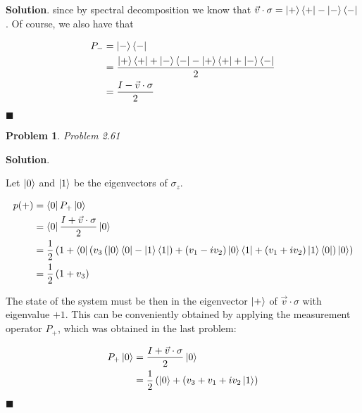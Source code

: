 \documentclass[12pt]{article}
\newtheorem{p}{Problem}
\theoremstyle{definition}
\newenvironment{s}{%
        \begin{trivlist} \item \textbf{Solution}. }{%
            \hspace*{\fill} $\blacksquare$\end{trivlist}}%
\begin{document}
{\begin{s}
since by spectral decomposition we know that  $\vec{v}\cdot\sigma = \ket{+}\bra{+} - \ket{-}\bra{-}$. Of course, we also have that 

\begin{align*}
P_{-} &= \ket{-}\bra{-}\\
&=\frac{\ket{+}\bra{+} + \ket{-}\bra{-} - \ket{+}\bra{+} + \ket{-}\bra{-}}{2}\\ 
&= \frac{I-\vec{v}\cdot\sigma}{2}
\end{align*}



\end{s}
\begin{p}
Problem 2.61
\end{p}

\begin{s}

Let $\ket{0}$ and $\ket{1}$ be the eigenvectors of $\sigma_{z}$.

\begin{align*}
p(+) &= \bra{0} P_{+}\ket{0}\\
&= \bra{0} \frac{I + \vec{v}\cdot\sigma}{2}\ket{0}\\
&= \frac{1}{2}\left(1 + \bra{0}\left(v_{3}\left(\ket{0}\bra{0} - \ket{1}\bra{1}\right) + \left(v_{1}-iv_{2}\right)\ket{0}\bra{1} + \left(v_{1}+iv_{2}\right)\ket{1}\bra{0}\right)\ket{0}\right)\\
&= \frac{1}{2}\left(1 + v_{3}\right)
\end{align*}

The state of the system must be then in the eigenvector $\ket{+}$ of $\vec{v}\cdot\sigma$ with eigenvalue $+1$. This can be conveniently obtained by applying the measurement operator $P_{+}$, which was obtained in the last problem: 


\begin{align*} 
P_{+}\ket{0} &= \frac{I+\vec{v}\cdot\sigma}{2}\ket{0}\\
&= \frac{1}{2}\left(\ket{0} + (v_{3} + v_{1} + iv_{2}\ket{1}\right)
\end{align*}

\end{s}
\end{document}
